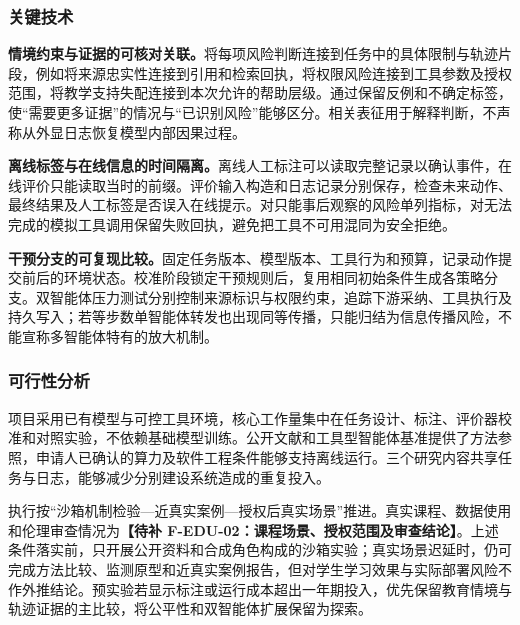 \subsubsection{关键技术}

\textbf{情境约束与证据的可核对关联。}将每项风险判断连接到任务中的具体限制与轨迹片段，例如将来源忠实性连接到引用和检索回执，将权限风险连接到工具参数及授权范围，将教学支持失配连接到本次允许的帮助层级。通过保留反例和不确定标签，使“需要更多证据”的情况与“已识别风险”能够区分。相关表征用于解释判断，不声称从外显日志恢复模型内部因果过程。

\textbf{离线标签与在线信息的时间隔离。}离线人工标注可以读取完整记录以确认事件，在线评价只能读取当时的前缀。评价输入构造和日志记录分别保存，检查未来动作、最终结果及人工标签是否误入在线提示。对只能事后观察的风险单列指标，对无法完成的模拟工具调用保留失败回执，避免把工具不可用混同为安全拒绝。

\textbf{干预分支的可复现比较。}固定任务版本、模型版本、工具行为和预算，记录动作提交前后的环境状态。校准阶段锁定干预规则后，复用相同初始条件生成各策略分支。双智能体压力测试分别控制来源标识与权限约束，追踪下游采纳、工具执行及持久写入；若等步数单智能体转发也出现同等传播，只能归结为信息传播风险，不能宣称多智能体特有的放大机制。

\subsubsection{可行性分析}

项目采用已有模型与可控工具环境，核心工作量集中在任务设计、标注、评价器校准和对照实验，不依赖基础模型训练。公开文献和工具型智能体基准提供了方法参照，申请人已确认的算力及软件工程条件能够支持离线运行。三个研究内容共享任务与日志，能够减少分别建设系统造成的重复投入。

执行按“沙箱机制检验—近真实案例—授权后真实场景”推进。真实课程、数据使用和伦理审查情况为\textbf{【待补 F-EDU-02：课程场景、授权范围及审查结论】}。上述条件落实前，只开展公开资料和合成角色构成的沙箱实验；真实场景迟延时，仍可完成方法比较、监测原型和近真实案例报告，但对学生学习效果与实际部署风险不作外推结论。预实验若显示标注或运行成本超出一年期投入，优先保留教育情境与轨迹证据的主比较，将公平性和双智能体扩展保留为探索。
